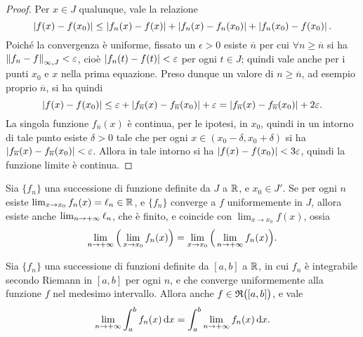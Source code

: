 \begin{proof}
	Per $x\in J$ qualunque, vale la relazione
	\begin{equation}
		\left|{f(x)-f(x_0)}\right|\leq\left|{f_n(x)-f(x)}\right|+\left|{f_n(x)-f_n(x_0)}\right|+\left|{f_n(x_0)-f(x_0)}\right|.
	\end{equation}
	Poiché la convergenza è uniforme, fissato un $\epsilon>0$ esiste $\overline{n}$ per cui $\forall n\geq\overline{n}$ si ha $\left\|{f_n-f}\right\|_{\infty,J}<\varepsilon$, cioè $\left|{f_n(t)-f(t)}\right|<\varepsilon$ per ogni $t\in J$; quindi vale anche per i punti $x_0$ e $x$ nella prima equazione. Preso dunque un valore di $n\geq\overline{n}$, ad esempio proprio $\overline{n}$, si ha quindi
	\begin{equation}
		\left|{f(x)-f(x_0)}\right|\leq\varepsilon+\left|{f_{\overline n}(x)-f_{\overline n}(x_0)}\right|+\varepsilon=\left|{f_{\overline n}(x)-f_{\overline n}(x_0)}\right|+2\varepsilon.
	\end{equation}
	La singola funzione $f_{\overline n}(x)$ è continua, per le ipotesi, in $x_0$, quindi in un intorno di tale punto esiste $\delta>0$ tale che per ogni $x\in(x_0-\delta,x_0+\delta)$ si ha $\left|{f_{\overline n}(x)-f_{\overline n}(x_0)}\right|<\varepsilon$.
	Allora in tale intorno si ha $\left|{f(x)-f(x_0)}\right|<3\varepsilon$, quindi la funzione limite è continua.
\end{proof}
\begin{teorema} \label{t:doppio_limite}
Sia $\{f_n\}$ una successione di funzione definite da $J$ a $\mathbb{R}$, e $x_0\in J'$. Se per ogni $n$ esiste $\lim_{x\to x_0}f_n(x)=\ell_n\in\mathbb{R}$, e $\{f_n\}$ converge a $f$ uniformemente in $J$, allora esiste anche $\lim_{n\to+\infty}\ell_n$, che è finito, e coincide con $\lim_{x\to x_0}f(x)$, ossia
\begin{equation} \label{eq:doppio_limite}
\lim_{n\to+\infty}\Big(\lim_{x\to x_0}f_n(x)\Big)=\lim_{x\to x_0}\Big(\lim_{n\to+\infty}f_n(x)\Big).
\end{equation}
\end{teorema}
\begin{teorema} \label{t:scambio_integrale_limite}
Sia $\{f_n\}$ una successione di funzioni definite da $[a,b]$ a $\mathbb{R}$, in cui $f_n$ è integrabile secondo Riemann in $[a,b]$ per ogni $n$, e che converge uniformemente alla funzione $f$ nel medesimo intervallo. Allora anche $f\in\mathfrak{R}\big([a,b]\big)$, e vale
\begin{equation} \label{eq:scambio_integrale_limite}
\lim_{n\to+\infty}\int_a^bf_n(x)\,\textup{d} x=\int_a^b\lim_{n\to+\infty}f_n(x)\,\textup{d} x.
\end{equation}
\end{teorema}
